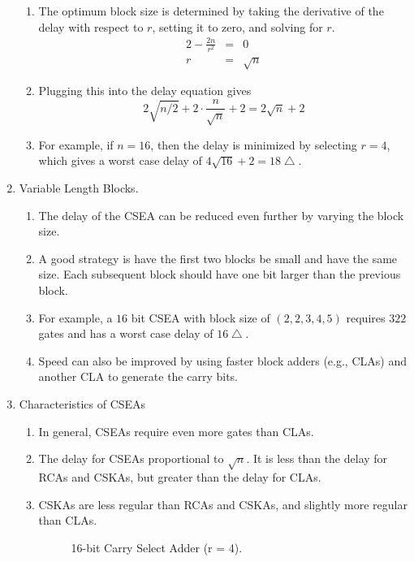 \documentclass[times, twocolumn, 10pt]{article}
\begin{document}
\begin{enumerate}
  \begin{enumerate}
  \item The optimum block size is determined by taking the derivative
    of the delay with respect to $r$, setting it to zero, and 
    solving for $r$. 
    \begin{eqnarray*}
      2 - \frac{2 n}{r^{2}} & = & 0  \\
      r & = & \sqrt{n} 
    \end{eqnarray*}
  \item Plugging this into the delay equation gives 
    \begin{displaymath}
      2 \sqrt{n/2} + 2 \cdot \frac{n}{\sqrt{n}} + 2 = 2 \sqrt{n} + 2
    \end{displaymath}
  \item For example, if $n = 16$, then the delay is minimized by
    selecting $r = 4$, which gives a worst case delay of 
    $4 \sqrt{16} + 2 = 18 \bigtriangleup$. 
  \end{enumerate}
\item Variable Length Blocks. 
  \begin{enumerate}
  \item The delay of the CSEA can be reduced even further by varying the
  block size. 
  \item A good strategy is have the first two blocks be small and have the
  same size. Each subsequent block should have one bit larger than the
  previous block. 
  \item For example, a $16$ bit CSEA with block size of $(2, 2, 3, 4, 5)$ 
    requires $322$ gates and has a worst case delay of $16 \bigtriangleup$.
  \item Speed can also be improved by using faster block adders (e.g., CLAs) 
    and another CLA to generate the carry bits.  
  \end{enumerate}
\item Characteristics of CSEAs
  \begin{enumerate}
  \item In general, CSEAs require even more gates than CLAs. 
  \item The delay for CSEAs proportional to $\sqrt{n}$. It is less
    than the delay for RCAs and CSKAs, but greater than the delay for CLAs. 
  \item CSKAs are less regular than RCAs and CSKAs, and slightly more regular 
    than CLAs. 

    \begin{figure*}
      \begin{center}
	\setlength{\unitlength}{0.0105in}%
      \end{center}
      \label{csel16.fig}
      \caption{16-bit Carry Select Adder (r = 4).}
    \end{figure*}

  \end{enumerate}
\end{enumerate}
\end{document}
